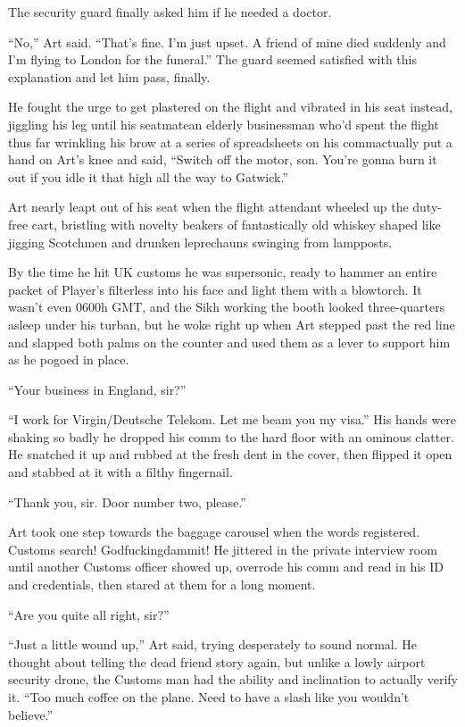The security guard finally asked him if he needed a doctor.

“No,” Art said. “That’s fine. I’m just upset. A friend of mine died
suddenly and I’m flying to London for the funeral.” The guard
seemed satisfied with this explanation and let him pass, finally.

He fought the urge to get plastered on the flight and vibrated in
his seat instead, jiggling his leg until his seatmate{\dash}an elderly
businessman who’d spent the flight thus far wrinkling his brow at a
series of spreadsheets on his comm{\dash}actually put a hand on Art’s
knee and said, “Switch off the motor, son. You’re gonna burn it out
if you idle it that high all the way to Gatwick.”

Art nearly leapt out of his seat when the flight attendant wheeled
up the duty-free cart, bristling with novelty beakers of
fantastically old whiskey shaped like jigging Scotchmen and drunken
leprechauns swinging from lampposts.

By the time he hit UK customs he was supersonic, ready to hammer an
entire packet of Player’s filterless into his face and light them
with a blowtorch. It wasn’t even 0600h GMT, and the Sikh working
the booth looked three-quarters asleep under his turban, but he
woke right up when Art stepped past the red line and slapped both
palms on the counter and used them as a lever to support him as he
pogoed in place.

“Your business in England, sir?”

“I work for Virgin/Deutsche Telekom. Let me beam you my visa.” His
hands were shaking so badly he dropped his comm to the hard floor
with an ominous clatter. He snatched it up and rubbed at the fresh
dent in the cover, then flipped it open and stabbed at it with a
filthy fingernail.

“Thank you, sir. Door number two, please.”

Art took one step towards the baggage carousel when the words
registered. Customs search! Godfuckingdammit! He jittered in the
private interview room until another Customs officer showed up,
overrode his comm and read in his ID and credentials, then stared
at them for a long moment.

“Are you quite all right, sir?”

“Just a little wound up,” Art said, trying desperately to sound
normal. He thought about telling the dead friend story again, but
unlike a lowly airport security drone, the Customs man had the
ability and inclination to actually verify it. “Too much coffee on
the plane. Need to have a slash like you wouldn’t believe.”


